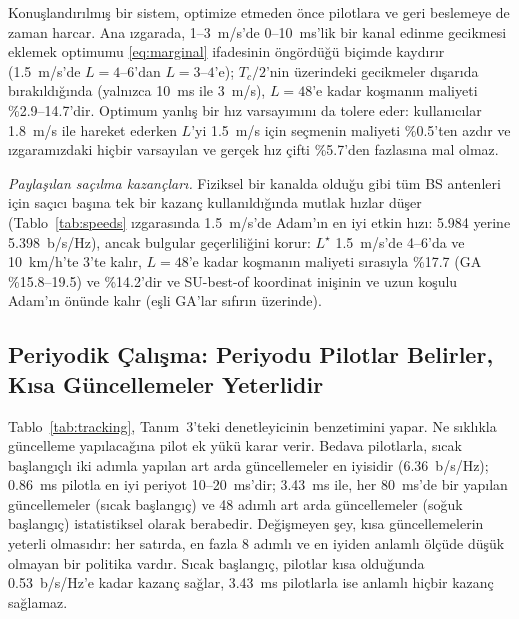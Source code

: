 Konuşlandırılmış bir sistem, optimize etmeden önce pilotlara ve geri beslemeye de zaman harcar. Ana ızgarada, 1--3~m/s'de 0--10~ms'lik bir kanal edinme gecikmesi eklemek optimumu \eqref{eq:marginal} ifadesinin öngördüğü biçimde kaydırır (1.5~m/s'de $L=4$--$6$'dan $L=3$--$4$'e); $T_c/2$'nin üzerindeki gecikmeler dışarıda bırakıldığında (yalnızca 10~ms ile 3~m/s), $L=48$'e kadar koşmanın maliyeti \%2.9--14.7'dir. Optimum yanlış bir hız varsayımını da tolere eder: kullanıcılar 1.8~m/s ile hareket ederken $L$'yi 1.5~m/s için seçmenin maliyeti \%0.5'ten azdır ve ızgaramızdaki hiçbir varsayılan ve gerçek hız çifti \%5.7'den fazlasına mal olmaz.

\emph{Paylaşılan saçılma kazançları.} Fiziksel bir kanalda olduğu gibi tüm BS antenleri için saçıcı başına tek bir kazanç kullanıldığında mutlak hızlar düşer (Tablo~\ref{tab:speeds} ızgarasında 1.5~m/s'de Adam'ın en iyi etkin hızı: 5.984 yerine 5.398~b/s/Hz), ancak bulgular geçerliliğini korur: $L^\star$ 1.5~m/s'de 4--6'da ve 10~km/h'te 3'te kalır, $L=48$'e kadar koşmanın maliyeti sırasıyla \%17.7 (GA \%15.8--19.5) ve \%14.2'dir ve SU-best-of koordinat inişinin ve uzun koşulu Adam'ın önünde kalır (eşli GA'lar sıfırın üzerinde).

\subsection{Periyodik Çalışma: Periyodu Pilotlar Belirler, Kısa Güncellemeler Yeterlidir}
\label{sec:res_tracking}
Tablo~\ref{tab:tracking}, Tanım~3'teki denetleyicinin benzetimini yapar. Ne sıklıkla güncelleme yapılacağına pilot ek yükü karar verir. Bedava pilotlarla, sıcak başlangıçlı iki adımla yapılan art arda güncellemeler en iyisidir (6.36~b/s/Hz); 0.86~ms pilotla en iyi periyot 10--20~ms'dir; 3.43~ms ile, her 80~ms'de bir yapılan güncellemeler (sıcak başlangıç) ve 48 adımlı art arda güncellemeler (soğuk başlangıç) istatistiksel olarak berabedir. Değişmeyen şey, kısa güncellemelerin yeterli olmasıdır: her satırda, en fazla 8 adımlı ve en iyiden anlamlı ölçüde düşük olmayan bir politika vardır. Sıcak başlangıç, pilotlar kısa olduğunda 0.53~b/s/Hz'e kadar kazanç sağlar, 3.43~ms pilotlarla ise anlamlı hiçbir kazanç sağlamaz.

\begin{table}[t]
\centering
\caption{Periyodik yeniden optimizasyon (eskime kümesi): $T_{\mathrm{p}}$ pilot süreleri için en iyi güncelleme periyodu $U$ (ms; b2b = art arda) ve güncelleme başına adım $L$, zaman ortalamalı etkin hızla (b/s/Hz) birlikte. Sıcak$-$soğuk: en iyi iki politikanın eşli farkı; $^\S$anlamlı değil.}
\label{tab:tracking}
\footnotesize
\setlength{\tabcolsep}{5.5pt}

\end{table}

